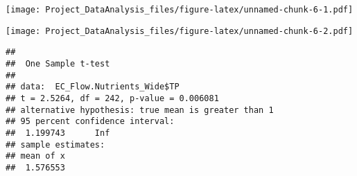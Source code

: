 \documentclass[]{article}
\newenvironment{Shaded}{\begin{snugshade}}{\end{snugshade}}
\newcommand{\CommentTok}[1]{\textcolor[rgb]{0.56,0.35,0.01}{\textit{#1}}}
\newcommand{\DataTypeTok}[1]{\textcolor[rgb]{0.13,0.29,0.53}{#1}}
\newcommand{\DecValTok}[1]{\textcolor[rgb]{0.00,0.00,0.81}{#1}}
\newcommand{\KeywordTok}[1]{\textcolor[rgb]{0.13,0.29,0.53}{\textbf{#1}}}
\newcommand{\NormalTok}[1]{#1}
\newcommand{\OperatorTok}[1]{\textcolor[rgb]{0.81,0.36,0.00}{\textbf{#1}}}
\newcommand{\StringTok}[1]{\textcolor[rgb]{0.31,0.60,0.02}{#1}}
\begin{document}
\texttt{[image: Project\_DataAnalysis\_files/figure-latex/unnamed-chunk-6-1.pdf]}

\begin{Shaded}
\end{Shaded}

\texttt{[image: Project\_DataAnalysis\_files/figure-latex/unnamed-chunk-6-2.pdf]}

\begin{Shaded}
\end{Shaded}

\begin{verbatim}
## 
##  One Sample t-test
## 
## data:  EC_Flow.Nutrients_Wide$TP
## t = 2.5264, df = 242, p-value = 0.006081
## alternative hypothesis: true mean is greater than 1
## 95 percent confidence interval:
##  1.199743      Inf
## sample estimates:
## mean of x 
##  1.576553
\end{verbatim}
\end{document}
